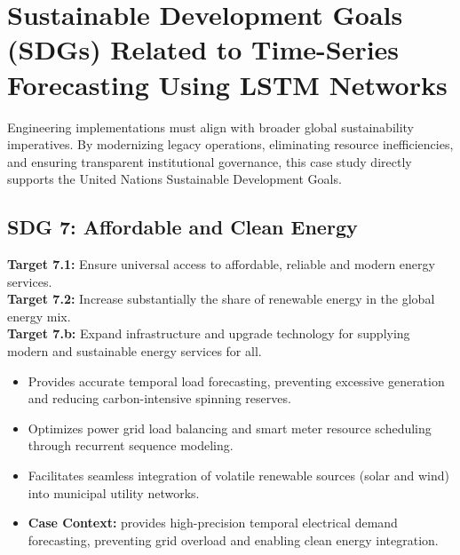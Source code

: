 \section{Sustainable Development Goals (SDGs) Related to Time-Series Forecasting Using LSTM Networks}
Engineering implementations must align with broader global sustainability imperatives. By modernizing legacy operations, eliminating resource inefficiencies, and ensuring transparent institutional governance, this case study directly supports the United Nations Sustainable Development Goals.

\subsection{SDG 7: Affordable and Clean Energy}
\noindent\textbf{Target 7.1:} Ensure universal access to affordable, reliable and modern energy services. \\
\noindent\textbf{Target 7.2:} Increase substantially the share of renewable energy in the global energy mix. \\
\noindent\textbf{Target 7.b:} Expand infrastructure and upgrade technology for supplying modern and sustainable energy services for all.
\begin{itemize}
  \item Provides accurate temporal load forecasting, preventing excessive generation and reducing carbon-intensive spinning reserves.
  \item Optimizes power grid load balancing and smart meter resource scheduling through recurrent sequence modeling.
  \item Facilitates seamless integration of volatile renewable sources (solar and wind) into municipal utility networks.
  \item \textbf{Case Context:} provides high-precision temporal electrical demand forecasting, preventing grid overload and enabling clean energy integration.
\end{itemize}

